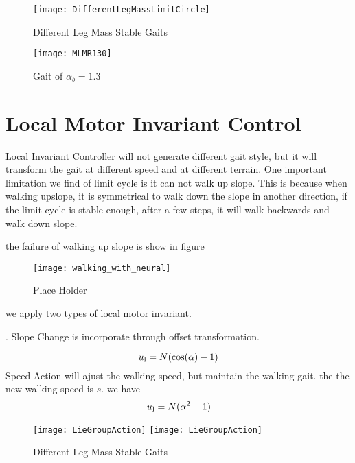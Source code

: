 \begin{figure}[!htbp]
  \begin{center}
      \texttt{[image: DifferentLegMassLimitCircle]}
    \caption{Different Leg Mass Stable Gaits}
    \label{fig:differentlr}
\end{center}
\end{figure}




\begin{figure}[!htbp]
  \begin{center}
      \texttt{[image: MLMR130]}
    \caption{Gait of $\alpha_b=1.3$}
    \label{fig:lm2}
\end{center}
\end{figure}


\section{Local Motor Invariant Control}
Local Invariant Controller will not generate different gait style, but it will transform the gait at different speed and at different terrain.
One important limitation we find of limit cycle is it can not walk up slope.
This is because when walking upslope, it is symmetrical to walk down the slope in another direction, if the limit cycle is stable enough, after a few steps, it will walk backwards and walk down slope.


the failure of walking up slope is show in figure

\begin{figure}[!htbp]
  \begin{center}
      \texttt{[image: walking\_with\_neural]}
    \caption{Place Holder}
    \label{fig:withoutlocalcontroller}
\end{center}
\end{figure}

we apply two types of local motor invariant.
\begin{itemize}

.
Slope Change is incorporate through offset transformation.

\[
u_{\mathrm{l}}=N(\mathrm{cos}(\alpha)-1)
\]
Speed Action will ajust the walking speed, but maintain the walking gait.
the the new walking speed is $s$.
we have
\[  
u_{\mathrm{l}}=N(\alpha^2-1)
\]
\end{itemize}

\begin{figure}[!htbp]
  \begin{center}
    \leavevmode
    \ifpdf
      \texttt{[image: LieGroupAction]}
    \else
      \texttt{[image: LieGroupAction]}
    \fi
    \caption{Different Leg Mass Stable Gaits}
    \label{fig:differentlr}
\end{center}
\end{figure}

